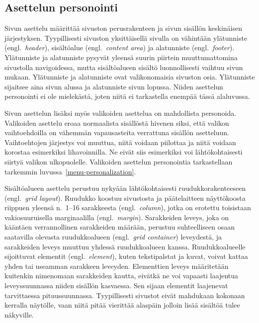 \documentclass[finnish, 12pt, a4paper, elec, utf8, a-1b, online]{aaltothesis}
\begin{document}
\subsection{Asettelun personointi}\label{layout-personalization}

Sivun asettelu määrittää sivuston perusrakenteen ja sivun sisällön keskinäisen
järjestyksen. Tyypillisesti sivuston yksittäisellä sivulla on vähintään
ylätunniste (engl.~\textit{header}), sisältöalue (engl.~\textit{content area})
ja alatunniste (engl.~\textit{footer}). Ylätunniste ja alatunniste pysyvät
yleensä suurin piirtein muuttumattomina sivustolla navigoidessa, mutta
sisältöalueen sisältö luonnollisesti vaihtuu sivun mukaan. Ylätunniste ja
alatunniste ovat valikonomaisia sivuston osia. Ylätunniste sijaitsee aina sivun
alussa ja alatunniste sivun lopussa. Niiden asettelun personointi ei ole
mielekästä, joten niitä ei tarkastella enempää tässä alaluvussa.

Sivun asettelun lisäksi myös valikoiden asettelua on mahdollista personoida.
Valikoiden asettelu eroaa normaalista sisällöstä hivenen siksi, että valikon
vaihtoehdoilla on vähemmän vapausasteita verrattuna sisällön asetteluun.
Vaihtoehtojen järjestys voi muuttua, niitä voidaan piilottaa ja niitä voidaan
korostaa esimerkiksi lihavoinnilla. Ne eivät siis esimerkiksi voi
lähtökohtaisesti siirtyä valikon ulkopuolelle. Valikoiden asettelun personointia
tarkastellaan tarkemmin luvussa~\ref{menu-personalization}.

Sisältöalueen asettelu perustuu nykyään lähtökohtaisesti ruudukkorakenteeseen
(engl.~\textit{grid layout}). Ruudukko koostuu sivustosta ja päätelaitteen
näyttökoosta riippuen yleensä n.~1--16 sarakkeesta (engl.~\textit{column}),
jotka on erotettu toisistaan vakiosuuruisella marginaalilla
(engl.~\textit{margin}). Sarakkeiden leveys, joka on kääntäen verrannollinen
sarakkeiden määrään, perustuu suhteelliseen osaan saatavilla olevasta
ruudukkoalueen (engl.~\textit{grid container}) leveydestä, ja sarakkeiden leveys
muuttuu yhdessä ruudukkoalueen kanssa. Ruudukkoalueelle sijoittuvat elementit
(engl.~\textit{element}), kuten tekstipalstat ja kuvat, voivat kattaa yhden tai
useamman sarakkeen leveyden. Elementtien leveys määritetään kuitenkin nimenomaan
sarakkeiden kautta, eivätkä ne voi vapaasti laajentua leveyssuunnassa niiden
sisällön kasvaessa. Sen sijaan elementit laajenevat tarvittaessa
pituussuunnassa. Tyypillisesti sivustot eivät mahdukaan kokonaan kerralla
näytölle, vaan niitä pitää vierittää alaspäin jolloin lisää sisältöä tulee
näkyville.
\end{document}

